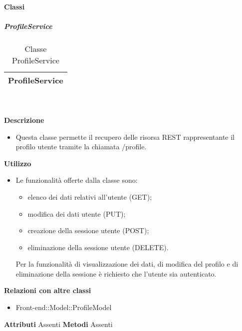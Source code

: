 		\paragraph{Classi}
			\subparagraph{ProfileService} 
\begin{table}[ht]
\begin{center}
\bgroup
	\setlength{\arrayrulewidth}{0.6mm}
	\def\arraystretch{1}
		\begin{tabular}{ | p{12cm} | }
				\hline  
					\centerline{\textbf{ProfileService}}
		\\ \hline 
				\hline
				\hline
		
		\end{tabular}
\egroup
\caption{Classe ProfileService}
\end{center}
\end{table} \textbf{\\ \\ Descrizione}
\begin{itemize}
\item[] Questa classe permette il recupero delle risorsa REST rappresentante il profilo utente tramite la chiamata /profile.
\end{itemize} 
\textbf{Utilizzo}
\begin{itemize}
\item[] Le funzionalità offerte dalla classe sono:
\begin{itemize}
\item elenco dei dati relativi all'utente (GET);
\item modifica dei dati utente (PUT);
\item creazione della sessione utente (POST);
\item eliminazione della sessione utente (DELETE).
\end{itemize}

Per la funzionalità di visualizzazione dei dati, di modifica del profilo e di eliminazione della sessione è richiesto che l'utente sia autenticato.
\end{itemize}
\textbf{Relazioni con altre classi}
\begin{itemize}
\item{Front-end::Model::ProfileModel}
\end{itemize}
\textbf{Attributi}
Assenti
\textbf{Metodi}
Assenti

